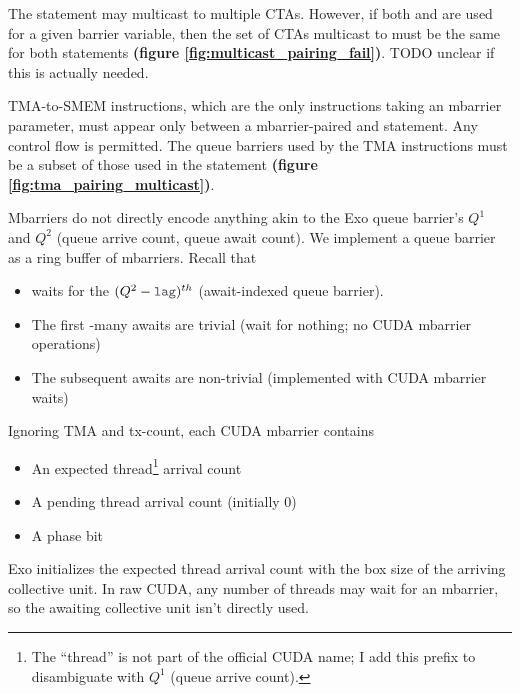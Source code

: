 The  statement may multicast to multiple CTAs.
However, if both  and  are used for a given barrier variable, then the set of CTAs multicast to must be the same for both statements \textbf{(figure \ref{fig:multicast_pairing_fail})}.
TODO unclear if this is actually needed.

\filbreak
{}

TMA-to-SMEM instructions, which are the only instructions taking an mbarrier parameter, must appear only between a mbarrier-paired  and  statement.
Any control flow is permitted.
The queue barriers used by the TMA instructions must be a subset of those used in the  statement \textbf{(figure \ref{fig:tma_pairing_multicast})}.

\filbreak
{}

Mbarriers do not directly encode anything akin to the Exo queue barrier's $Q^1$ and $Q^2$ (queue arrive count, queue await count).
We implement a queue barrier as a ring buffer of mbarriers.
Recall that
\begin{itemize}
  \item {} waits for the $(Q^2 - \lighttt{lag})^{th}$  (await-indexed queue barrier).
  \filbreak
  \item The first -many awaits are trivial (wait for nothing; no CUDA mbarrier operations)
  \filbreak
  \item The subsequent awaits are non-trivial (implemented with CUDA mbarrier waits)
\end{itemize}
\filbreak
Ignoring TMA and tx-count, each CUDA mbarrier contains
\begin{itemize}
  \item An expected thread\footnote{The ``thread'' is not part of the official CUDA name; I add this prefix to disambiguate with $Q^1$ (queue arrive count).} arrival count
  \filbreak
  \item A pending thread arrival count (initially 0)
  \filbreak
  \item A phase bit
\end{itemize}
Exo initializes the expected thread arrival count with the box size of the arriving collective unit.
In raw CUDA, any number of threads may wait for an mbarrier, so the awaiting collective unit isn't directly used.

